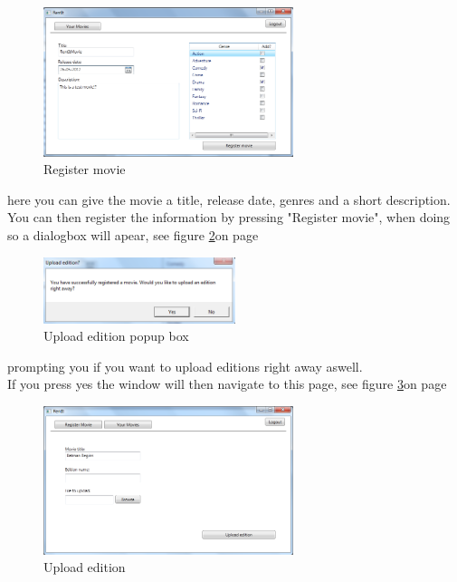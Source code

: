 \begin{figure}[h!]  
\caption{Register movie}
\label{fig:Manual_Client_Navigation_Upload_Register}
  \centering
\includegraphics[width=0.65\textwidth]{Parts/Images/Manual/CPRegistermovie}
\end{figure}
 
 here you can give the movie a title,  release date, genres and a short description. You can then register the information by pressing "Register movie", when doing so a dialogbox will apear, see figure \ref{fig:Manual_Client_Navigation_Upload_Popup}on page \pageref{fig:Manual_Client_Navigation_Upload_Popup}


\begin{figure}[h!]  
\caption{Upload edition popup box}
\label{fig:Manual_Client_Navigation_Upload_Popup}
  \centering
\includegraphics[width=0.5\textwidth]{Parts/Images/Manual/RegisterPopup}
\end{figure}
 
 prompting you if you want to upload editions right away aswell.
\\If you press yes the window will then navigate to this page, see figure \ref{fig:Manual_Client_Navigation_Upload_Edition}on page \pageref{fig:Manual_Client_Navigation_Upload_Edition}


\begin{figure}[h!]  
\caption{Upload edition}
\label{fig:Manual_Client_Navigation_Upload_Edition}
  \centering
\includegraphics[width=0.65\textwidth]{Parts/Images/Manual/CPUploadEdition}
\end{figure}
 
